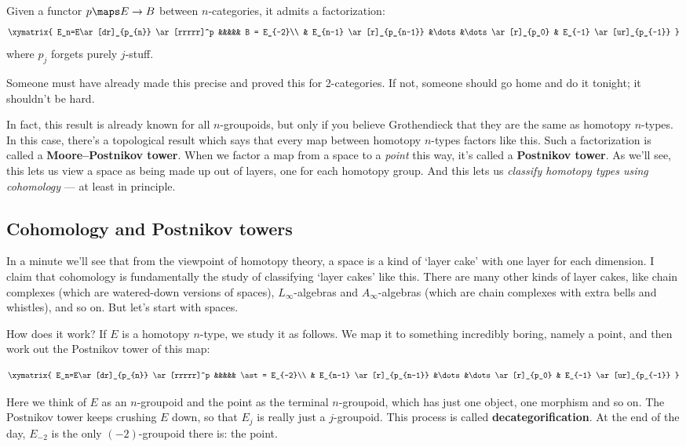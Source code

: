 \documentclass{amsart}
\begin{document}
\begin{hyp}
  Given a functor $p\maps E\to B$ between $n$-categories, it admits a
  factorization:
\[\xymatrix{
  E_n=E\ar[dr]_{p_{n}} \ar[rrrrr]^p &&&&& B = E_{-2}\\
  & E_{n-1} \ar[r]_{p_{n-1}} &\dots&\dots \ar[r]_{p_0} & E_{-1} 
    \ar[ur]_{p_{-1}} }\]
where $p_j$ forgets purely $j$-stuff.
\end{hyp}

Someone must have already made this precise and proved this
for 2-categories.  If not, someone should
go home and do it tonight; it shouldn't be hard.

In fact, this result is already known for all $n$-groupoids, but only
if you believe Grothendieck that they are the same as homotopy
$n$-types.  In this case, there's a topological result which says that
every map between homotopy $n$-types factors like this.  Such a
factorization is called a \textbf{Moore--Postnikov tower}.  When we
factor a map from a space to a {\it point} this way, it's called a
\textbf{Postnikov tower}.  As we'll see, this lets us view a space as
being made up out of layers, one for each homotopy group.  And this
lets us \emph{classify homotopy types using cohomology} --- at least
in principle.

\subsection{Cohomology and Postnikov towers}
\label{sec:cohomology}

In a minute we'll see that from the viewpoint of homotopy theory,
a space is a kind of `layer cake' with one layer for each dimension.
I claim that cohomology is fundamentally the study of
classifying `layer cakes' like this.  There are many other kinds of
layer cakes, like chain complexes (which are watered-down versions of
spaces), $L_\infty$-algebras and $A_\infty$-algebras (which are chain
complexes with extra bells and whistles), and so on.  But let's start
with spaces.

How does it work?  If $E$ is a homotopy $n$-type, we study it as
follows.  We map it to something incredibly boring, namely a point, 
and then work out the Postnikov tower of this map:

\[\xymatrix{
  E_n=E\ar[dr]_{p_{n}} \ar[rrrrr]^p &&&&& \ast = E_{-2}\\
  & E_{n-1} \ar[r]_{p_{n-1}} &\dots&\dots \ar[r]_{p_0} & E_{-1} 
    \ar[ur]_{p_{-1}} }\]

\noindent
Here we think of $E$ as an $n$-groupoid and the point as the
terminal $n$-groupoid, which has just one object, one morphism
and so on.  The Postnikov tower keeps crushing $E$ down, so
that $E_j$ is really just a $j$-groupoid.  This process is called
{\bf decategorification}.  At the end of the day,
$E_{-2}$ is the only $(-2)$-groupoid there is: the point.
\end{document}
